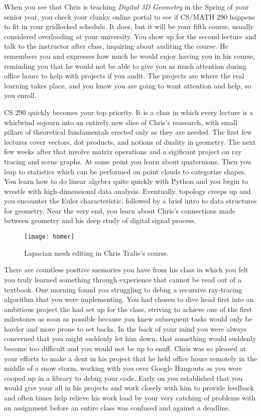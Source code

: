 \documentclass[../main.tex]{subfiles}
\begin{document}
When you see that Chris is teaching \textit{Digital 3D Geometry} in the Spring of your senior year, you check your clunky online portal to see if CS/MATH 290 happens to fit in your gridlocked schedule. It does, but it will be your fifth course, usually considered overloading at your university. You show up for the second lecture and talk to the instructor after class, inquiring about auditing the course. He remembers you and expresses how much he would enjoy having you in his course, reminding you that he would not be able to give you as much attention during office hours to help with projects if you audit. The projects are where the real learning takes place, and you know you are going to want attention and help, so you enroll.

CS 290 quickly becomes your top priority. It is a class in which every lecture is a whirlwind sojourn into an entirely new slice of Chris's reasearch, with small pillars of theoretical fundamentals erected only as they are needed. The first few lectures cover vectors, dot products, and notions of duality in geometry. The next few weeks after that involve matrix operations and a sigificant project on ray tracing and scene graphs. At some point you learn about quaternions. Then you leap to statistics which can be performed on point clouds to categorize shapes. You learn how to do linear algebra quite quickly with Python and you begin to wrestle with high-dimensional data analysis. Eventually, topology creeps up and you encounter the Euler characteristic, followed by a brief intro to data structures for geometry. Near the very end, you learn about Chris's connections made between geometry and his deep study of digital signal process.

\begin{figure}[h!]
	\centering
	\texttt{[image: homer]}
	\caption*{Lapacian mesh editing in Chris Tralie's course.}
\end{figure}

There are countless positive memories you have from his class in which you felt you truly learned something through experience that cannot be read out of a textbook. One morning found you struggling to debug a recursive ray-tracing algorithm that you were implementing. You had chosen to dive head first into an ambitious project the had set up for the class, striving to achieve one of the first milestones as soon as possible because you knew subsequent tasks would only be harder and more prone to set backs. In the back of your mind you were always concerned that you might suddenly let him down, that something would suddenly become too difficult and you would not be up to snuff. Chris was so pleased at your efforts to make a dent in his project that he held office hours remotely in the middle of a snow storm, working with you over Google Hangouts as you were cooped up in a library to debug your code. Early on you established that you would give your all in his projects and work closely with him to provide feedback and often times help relieve his work load by your very catching of problems with an assignment before an entire class was confused and against a deadline. 
\end{document}
